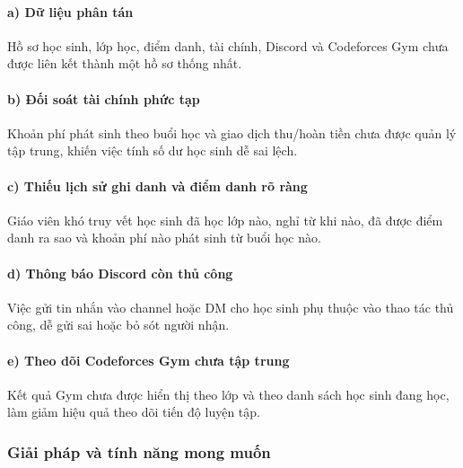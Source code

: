 \documentclass[12pt,a4paper]{article}
\begin{document}
\paragraph{a) Dữ liệu phân tán}
Hồ sơ học sinh, lớp học, điểm danh, tài chính, Discord và Codeforces Gym chưa
được liên kết thành một hồ sơ thống nhất.

\paragraph{b) Đối soát tài chính phức tạp}
Khoản phí phát sinh theo buổi học và giao dịch thu/hoàn tiền chưa được quản lý
tập trung, khiến việc tính số dư học sinh dễ sai lệch.

\paragraph{c) Thiếu lịch sử ghi danh và điểm danh rõ ràng}
Giáo viên khó truy vết học sinh đã học lớp nào, nghỉ từ khi nào, đã được điểm
danh ra sao và khoản phí nào phát sinh từ buổi học nào.

\paragraph{d) Thông báo Discord còn thủ công}
Việc gửi tin nhắn vào channel hoặc DM cho học sinh phụ thuộc vào thao tác thủ
công, dễ gửi sai hoặc bỏ sót người nhận.

\paragraph{e) Theo dõi Codeforces Gym chưa tập trung}
Kết quả Gym chưa được hiển thị theo lớp và theo danh sách học sinh đang học, làm
giảm hiệu quả theo dõi tiến độ luyện tập.

\subsubsection{Giải pháp và tính năng mong muốn}
\end{document}
